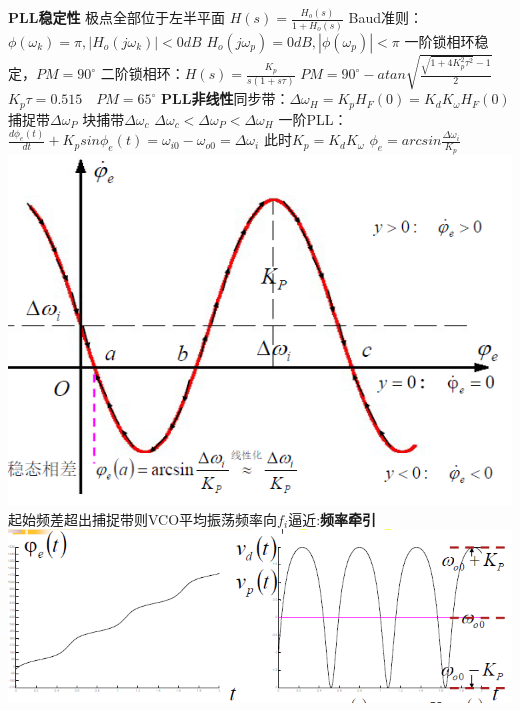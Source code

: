 \documentclass[10.5pt,landscape]{article}
\begin{document}
\begin{multicols*}{4}
  \textbf{PLL稳定性} 极点全部位于左半平面 $H(s) = \frac{H_o(s)}{1 + H_o(s)}$\newline
  Baud准则： $\phi(\omega_k) = \pi, |H_o(j\omega_k)| < 0dB$ $H_o(j\omega_p) = 0dB,  |\phi(\omega_p)| < \pi$ \newline
  一阶锁相环稳定，$PM = 90^{\circ}$ \newline
  二阶锁相环：$H(s) = \frac{K_p}{s(1 + s\tau)}$ $PM = 90^{\circ} - atan \sqrt{\frac{\sqrt{1 + 4 K_p^2\tau^2} - 1}{2}} $    $K_p \tau = 0.515 \quad PM = 65^{\circ}$\newline
  \textbf{PLL非线性}同步带：$\Delta \omega_H = K_p H_F(0) = K_d K_\omega H_F(0)$ \newline
  捕捉带$\Delta \omega_P$ 块捕带$\Delta \omega_c$ $\Delta \omega_c < \Delta \omega_P < \Delta \omega_H$ \newline
  一阶PLL：$\frac{d \phi_e(t)}{dt} + K_p sin \phi_e(t) = \omega_{i0} - \omega_{o0} = \Delta \omega_i$ \newline
  此时$K_p = K_d K_\omega$ $\phi_e = arcsin\frac{\Delta \omega_i}{K_p}$\newline
   \includegraphics[scale=0.4]{相图}\newline
 起始频差超出捕捉带则VCO平均振荡频率向$f_i$逼近:\textbf{频率牵引} \newline
 \includegraphics[scale=0.4]{频率牵引}\newline

\end{multicols*}
\end{document}
